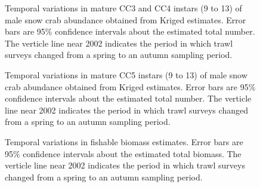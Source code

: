 \documentclass[11pt]{article}
\newcommand*{\D}{.}  %
\begin{document}
\begin{landscape}
\begin{figure}[ht]
\begin{center}
\end{center}
\caption{Temporal variations in mature CC3 and CC4 instars (9 to 13) of male snow crab abundance obtained from Kriged estimates. Error bars are 95\% confidence intervals about the estimated total number. The verticle line near 2002 indicates the period in which trawl surveys changed from a spring to an autumn sampling period.}
\label{ts.maCC34.no}
\end{figure}
\end{landscape}




\begin{landscape}
\begin{figure}[ht]
\begin{center}
\end{center}
\caption{Temporal variations in mature CC5 instars (9 to 13) of male snow crab abundance obtained from Kriged estimates. Error bars are 95\% confidence intervals about the estimated total number. The verticle line near 2002 indicates the period in which trawl surveys changed from a spring to an autumn sampling period.}
\label{ts.maCC5.no}
\end{figure}
\end{landscape}




\clearpage \newpage
\begin{figure}[ht]
\begin{center}
\end{center}
\caption{Temporal variations in fishable biomass estimates. Error bars are 95\% confidence intervals about the estimated total biomass. The verticle line near 2002 indicates the period in which trawl surveys changed from a spring to an autumn sampling period.}
\label{ts.R0.mass}
\end{figure}
\end{document}
